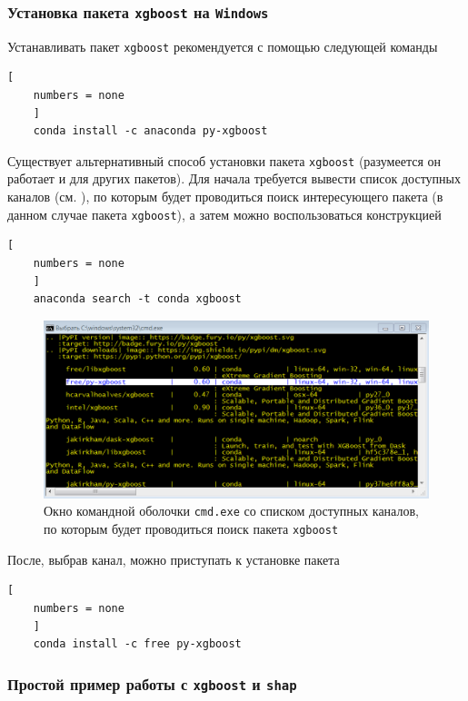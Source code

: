 \documentclass[%
	11pt,
	a4paper,
	utf8,
		]{article}
\begin{document}
\subsubsection{Установка пакета \texttt{xgboost} на \texttt{Windows}}

Устанавливать пакет \texttt{xgboost} рекомендуется с помощью следующей команды

\begin{lstlisting}[
	numbers = none
	]
	conda install -c anaconda py-xgboost 
\end{lstlisting}

Существует альтернативный способ установки пакета \texttt{xgboost} (разумеется он работает и для других пакетов). Для начала требуется вывести список доступных каналов (см. ), по которым будет проводиться поиск интересующего пакета (в данном случае пакета \texttt{xgboost}), а затем можно воспользоваться конструкцией

\begin{lstlisting}[
	numbers = none
	]
	anaconda search -t conda xgboost
\end{lstlisting}

\begin{figure}[h]
	\centering
	\includegraphics[scale=0.85]{figures/xgboost_conda_search.png}
	\caption{Окно командной оболочки \texttt{cmd.exe} со списком доступных каналов, по которым будет проводиться поиск пакета \texttt{xgboost} }\label{fig:xgboost_conda_search}
\end{figure}


После, выбрав канал, можно приступать к установке пакета

\begin{lstlisting}[
	numbers = none
	]
	conda install -c free py-xgboost
\end{lstlisting}

\subsubsection{Простой пример работы с \texttt{xgboost} и \texttt{shap}}
\end{document}
